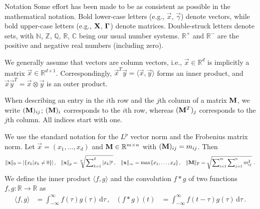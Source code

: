 \begin{FloatingBox}{Notation}
\setlength{\parskip}{0.5em}
Some effort has been made to be as consistent as possible in the mathematical notation.
Bold lower-case letters (e.g., $\vec x$, $\vec \gamma$) denote vectors, while bold upper-case letters (e.g., $\mathbf{X}$, $\mathbf{\Gamma}$) denote matrices.
Double-struck letters denote sets, with $\mathbb{N}$, $\mathbb{Z}$, $\mathbb{Q}$, $\mathbb{R}$, $\mathbb{C}$ being our usual number systems.
$\mathbb{R}^+$ and $\mathbb{R}^-$ are the positive and negative real numbers (including zero).

We generally assume that vectors are column vectors, i.e., $\vec x \in \mathbb{R}^d$ is implicitly a matrix $\vec x \in \mathbb{R}^{d \times 1}$.
Correspondingly, $\vec x^T \vec y =  \langle \vec x, \vec y \rangle$ forms an inner product, and $\vec x \vec y^T = \vec x \otimes \vec y$ is an outer product.

When describing an entry in the $i$th row and the $j$th column of a matrix $\mathbf{M}$, we write $( \mathbf{M} )_{ij}$; $(\mathbf{M})_i$ corresponds to the $i$th row, whereas $(\mathbf{M}^T)_j$ corresponds to the $j$th column.
All indices start with one.

We use the standard notation for the $L^p$ vector norm and the Frobenius matrix norm. Let $\vec x = (x_1, \ldots, x_d)$ and $\mathbf{M} \in \mathbb{R}^{m \times n}$ with $(\mathbf{M})_{ij} = m_{ij}$. Then
\begin{align*}
	\|\mathbf{x}\|_0 &= | \{ x_k | x_k \neq 0 \} | \,, & 
	\|\mathbf{x}\|_p &= \sqrt[p\,\,]{\sum\nolimits_{k=1}^d |x_k|^p } \,, &
	\|\mathbf{x}\|_\infty &= \max\{ x_1, \ldots, x_d\} \,, &
	\| \mathbf{M} \|_\mathrm{F} = \sqrt{\sum\nolimits_{i=1}^m \sum\nolimits_{j=1}^n m_{ij}^2} \,\,.
\end{align*}
We define the inner product $\langle f, g \rangle$ and the convolution $f \ast g$ of two functions $f, g : \mathbb{R} \longrightarrow \mathbb{R}$ as
\begin{align*}
	\langle f, g \rangle &= \int_{-\infty}^\infty f(\tau) g(\tau) \,\mathrm{d}{\tau} \,, & 
	(f \ast g)(t) &= \int_{-\infty}^\infty f(t - \tau) g(\tau) \,\mathrm{d}{\tau} \,.
\end{align*}
\end{FloatingBox}
